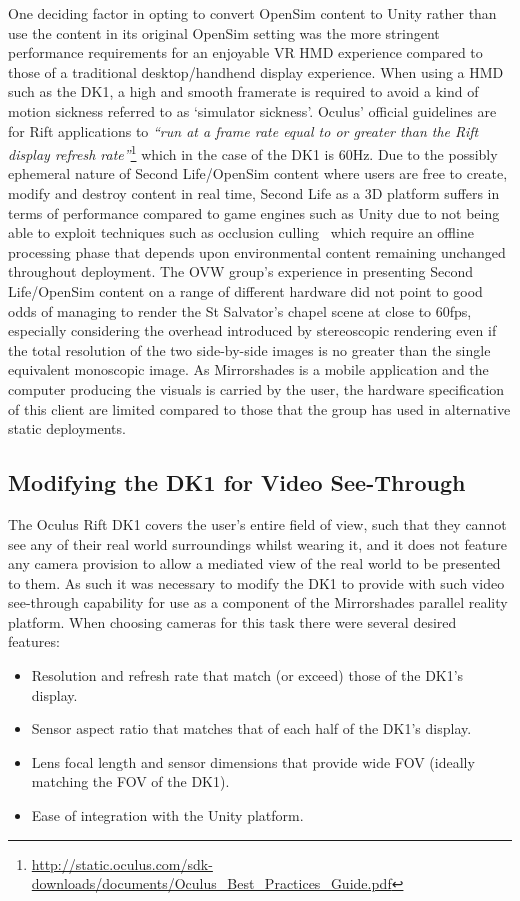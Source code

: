 One deciding factor in opting to convert OpenSim content to Unity rather than use the content in its original OpenSim setting was the more stringent performance requirements for an enjoyable VR HMD experience compared to those of a traditional desktop/handhend display experience. When using a HMD such as the DK1, a high and smooth framerate is required to avoid a kind of motion sickness referred to as `simulator sickness'. Oculus' official guidelines are for Rift applications to \textit{``run at a frame rate equal to or greater than the Rift display refresh rate''}\footnote{\url{http://static.oculus.com/sdk-downloads/documents/Oculus_Best_Practices_Guide.pdf}} which in the case of the DK1 is 60Hz. Due to the possibly ephemeral nature of Second Life/OpenSim content where users are free to create, modify and destroy content in real time, Second Life as a 3D platform suffers in terms of performance compared to game engines such as Unity due to not being able to exploit techniques such as occlusion culling~\cite{willmott:largecomplex} which require an offline processing phase that depends upon environmental content remaining unchanged throughout deployment. The OVW group's experience in presenting Second Life/OpenSim content on a range of different hardware did not point to good odds of managing to render the St Salvator's chapel scene at close to 60fps, especially considering the overhead introduced by stereoscopic rendering even if the total resolution of the two side-by-side images is no greater than the single equivalent monoscopic image. As Mirrorshades is a mobile application and the computer producing the visuals is carried by the user, the hardware specification of this client are limited compared to those that the group has used in alternative static deployments.


\subsection{Modifying the DK1 for Video See-Through}
\label{modifying-dk1}
The Oculus Rift DK1 covers the user's entire field of view, such that they cannot see any of their real world surroundings whilst wearing it, and it does not feature any camera provision to allow a mediated view of the real world to be presented to them. As such it was necessary to modify the DK1 to provide with such video see-through capability for use as a component of the Mirrorshades parallel reality platform. When choosing cameras for this task there were several desired features:
\begin{itemize}
	\item Resolution and refresh rate that match (or exceed) those of the DK1's display.
	\item Sensor aspect ratio that matches that of each half of the DK1's display.
	\item Lens focal length and sensor dimensions that provide wide FOV (ideally matching the FOV of the DK1).
	\item Ease of integration with the Unity platform.
\end{itemize}

